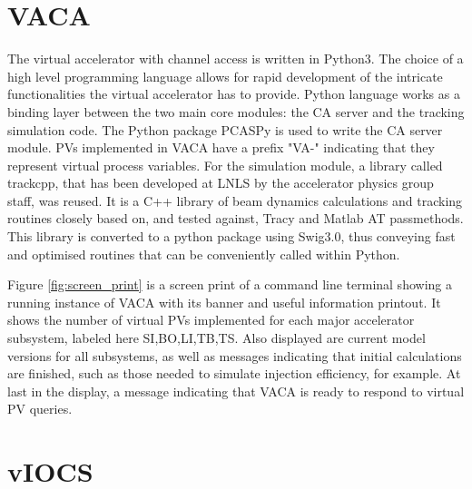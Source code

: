 \documentclass[a4paper,
              ]{jacow}
\begin{document}
\section{VACA}

The virtual accelerator with channel access is written in Python3.
The choice of a high level programming language allows for rapid development of the intricate functionalities the virtual accelerator has to provide.
Python language works as a binding layer between the two main core modules: the CA server and the tracking simulation code.
The Python package PCASPy\cite{pcaspy} is used to write the CA server module.
PVs implemented in VACA have a prefix "VA-" indicating that they represent virtual process variables.
For the simulation module, a library called trackcpp\cite{trackcpp}, that has been developed at LNLS by the accelerator physics group staff, was reused.
It is a C++ library of beam dynamics calculations and tracking routines closely based on, and tested against, Tracy\cite{tracy} and Matlab AT\cite{at} passmethods.
This library is converted to a python package using Swig3.0\cite{swig}, thus conveying fast and optimised routines that can be conveniently called within Python.

Figure \ref{fig:screen_print} is a screen print of a command line terminal showing a running instance of VACA with its banner
and useful information printout.
It shows the number of virtual PVs implemented for each major accelerator subsystem, labeled here SI,BO,LI,TB,TS.
Also displayed are current model versions for all subsystems, as well as messages indicating that initial calculations are finished,
such as those needed to simulate injection efficiency, for example.
At last in the display, a message indicating that VACA is ready to respond to virtual PV queries.


\section{vIOCS}
\end{document}
